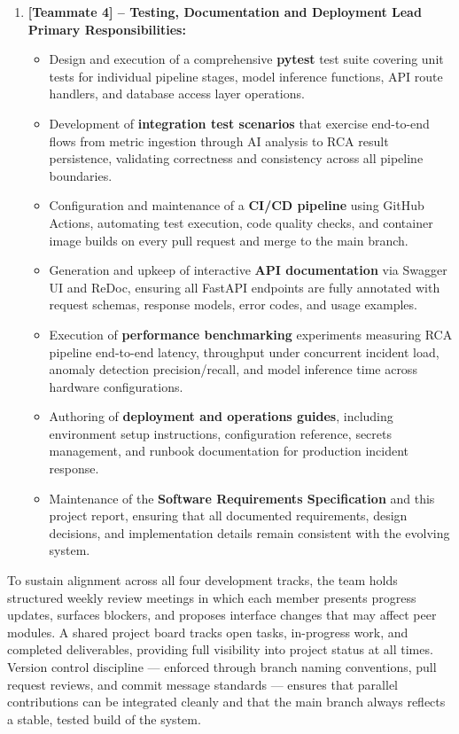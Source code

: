 \begin{enumerate}
    \item \textbf{[Teammate 4] -- Testing, Documentation and Deployment Lead}\\
    \textbf{Primary Responsibilities:}
    \begin{itemize}
        \item Design and execution of a comprehensive \textbf{pytest} test suite covering unit tests for individual pipeline stages, model inference functions, API route handlers, and database access layer operations.
        \item Development of \textbf{integration test scenarios} that exercise end-to-end flows from metric ingestion through AI analysis to RCA result persistence, validating correctness and consistency across all pipeline boundaries.
        \item Configuration and maintenance of a \textbf{CI/CD pipeline} using GitHub Actions, automating test execution, code quality checks, and container image builds on every pull request and merge to the main branch.
        \item Generation and upkeep of interactive \textbf{API documentation} via Swagger UI and ReDoc, ensuring all FastAPI endpoints are fully annotated with request schemas, response models, error codes, and usage examples.
        \item Execution of \textbf{performance benchmarking} experiments measuring RCA pipeline end-to-end latency, throughput under concurrent incident load, anomaly detection precision/recall, and model inference time across hardware configurations.
        \item Authoring of \textbf{deployment and operations guides}, including environment setup instructions, configuration reference, secrets management, and runbook documentation for production incident response.
        \item Maintenance of the \textbf{Software Requirements Specification} and this project report, ensuring that all documented requirements, design decisions, and implementation details remain consistent with the evolving system.
    \end{itemize}

\end{enumerate}

\hspace*{0.3in} To sustain alignment across all four development tracks, the team holds structured weekly review meetings in which each member presents progress updates, surfaces blockers, and proposes interface changes that may affect peer modules. A shared project board tracks open tasks, in-progress work, and completed deliverables, providing full visibility into project status at all times. Version control discipline — enforced through branch naming conventions, pull request reviews, and commit message standards — ensures that parallel contributions can be integrated cleanly and that the main branch always reflects a stable, tested build of the system.
